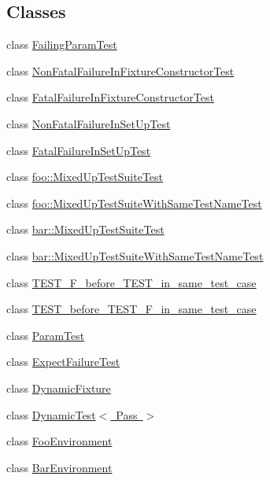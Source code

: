 \subsection*{Classes}
\begin{DoxyCompactItemize}
\item 
class \mbox{\hyperlink{class_failing_param_test}{Failing\+Param\+Test}}
\item 
class \mbox{\hyperlink{class_non_fatal_failure_in_fixture_constructor_test}{Non\+Fatal\+Failure\+In\+Fixture\+Constructor\+Test}}
\item 
class \mbox{\hyperlink{class_fatal_failure_in_fixture_constructor_test}{Fatal\+Failure\+In\+Fixture\+Constructor\+Test}}
\item 
class \mbox{\hyperlink{class_non_fatal_failure_in_set_up_test}{Non\+Fatal\+Failure\+In\+Set\+Up\+Test}}
\item 
class \mbox{\hyperlink{class_fatal_failure_in_set_up_test}{Fatal\+Failure\+In\+Set\+Up\+Test}}
\item 
class \mbox{\hyperlink{classfoo_1_1_mixed_up_test_suite_test}{foo\+::\+Mixed\+Up\+Test\+Suite\+Test}}
\item 
class \mbox{\hyperlink{classfoo_1_1_mixed_up_test_suite_with_same_test_name_test}{foo\+::\+Mixed\+Up\+Test\+Suite\+With\+Same\+Test\+Name\+Test}}
\item 
class \mbox{\hyperlink{classbar_1_1_mixed_up_test_suite_test}{bar\+::\+Mixed\+Up\+Test\+Suite\+Test}}
\item 
class \mbox{\hyperlink{classbar_1_1_mixed_up_test_suite_with_same_test_name_test}{bar\+::\+Mixed\+Up\+Test\+Suite\+With\+Same\+Test\+Name\+Test}}
\item 
class \mbox{\hyperlink{class_t_e_s_t___f__before___t_e_s_t__in__same__test__case}{T\+E\+S\+T\+\_\+\+F\+\_\+before\+\_\+\+T\+E\+S\+T\+\_\+in\+\_\+same\+\_\+test\+\_\+case}}
\item 
class \mbox{\hyperlink{class_t_e_s_t__before___t_e_s_t___f__in__same__test__case}{T\+E\+S\+T\+\_\+before\+\_\+\+T\+E\+S\+T\+\_\+\+F\+\_\+in\+\_\+same\+\_\+test\+\_\+case}}
\item 
class \mbox{\hyperlink{class_param_test}{Param\+Test}}
\item 
class \mbox{\hyperlink{class_expect_failure_test}{Expect\+Failure\+Test}}
\item 
class \mbox{\hyperlink{class_dynamic_fixture}{Dynamic\+Fixture}}
\item 
class \mbox{\hyperlink{class_dynamic_test}{Dynamic\+Test$<$ Pass $>$}}
\item 
class \mbox{\hyperlink{class_foo_environment}{Foo\+Environment}}
\item 
class \mbox{\hyperlink{class_bar_environment}{Bar\+Environment}}
\end{DoxyCompactItemize}
